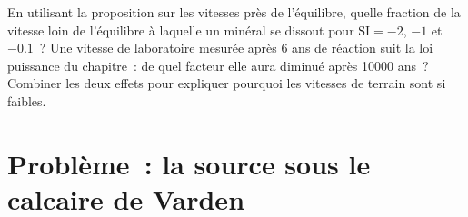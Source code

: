 \begin{exercise}[$\star\star\star$]\label{exo:b3:water-rock-interaction:12}
En utilisant la proposition sur les vitesses près de l'équilibre, quelle fraction
de la vitesse loin de l'équilibre à laquelle un minéral se dissout pour $\mathrm{SI} =
-2$, $-1$ et $-0.1$~? Une vitesse de laboratoire mesurée après 6 ans de réaction
suit la loi puissance du chapitre~: de quel facteur elle aura diminué
après \num{10000} ans~? Combiner les deux effets pour expliquer pourquoi les vitesses de terrain sont
si faibles.
\end{exercise}

\section{Problème~: la source sous le calcaire de Varden}

